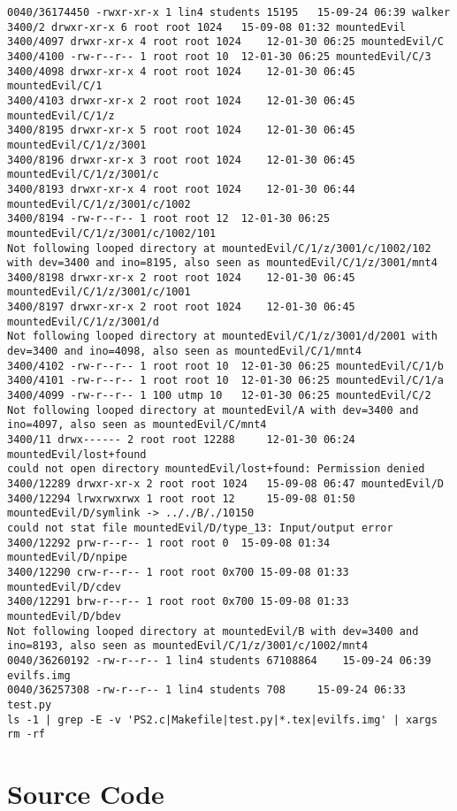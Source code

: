 \documentclass[12pt]{article}
\begin{document}
\begin{lstlisting}
0040/36174450 -rwxr-xr-x 1 lin4 students 15195	 15-09-24 06:39 walker
3400/2 drwxr-xr-x 6 root root 1024	 15-09-08 01:32 mountedEvil
3400/4097 drwxr-xr-x 4 root root 1024	 12-01-30 06:25 mountedEvil/C
3400/4100 -rw-r--r-- 1 root root 10	 12-01-30 06:25 mountedEvil/C/3
3400/4098 drwxr-xr-x 4 root root 1024	 12-01-30 06:45 mountedEvil/C/1
3400/4103 drwxr-xr-x 2 root root 1024	 12-01-30 06:45 mountedEvil/C/1/z
3400/8195 drwxr-xr-x 5 root root 1024	 12-01-30 06:45 mountedEvil/C/1/z/3001
3400/8196 drwxr-xr-x 3 root root 1024	 12-01-30 06:45 mountedEvil/C/1/z/3001/c
3400/8193 drwxr-xr-x 4 root root 1024	 12-01-30 06:44 mountedEvil/C/1/z/3001/c/1002
3400/8194 -rw-r--r-- 1 root root 12	 12-01-30 06:25 mountedEvil/C/1/z/3001/c/1002/101
Not following looped directory at mountedEvil/C/1/z/3001/c/1002/102 with dev=3400 and ino=8195, also seen as mountedEvil/C/1/z/3001/mnt4
3400/8198 drwxr-xr-x 2 root root 1024	 12-01-30 06:45 mountedEvil/C/1/z/3001/c/1001
3400/8197 drwxr-xr-x 2 root root 1024	 12-01-30 06:45 mountedEvil/C/1/z/3001/d
Not following looped directory at mountedEvil/C/1/z/3001/d/2001 with dev=3400 and ino=4098, also seen as mountedEvil/C/1/mnt4
3400/4102 -rw-r--r-- 1 root root 10	 12-01-30 06:25 mountedEvil/C/1/b
3400/4101 -rw-r--r-- 1 root root 10	 12-01-30 06:25 mountedEvil/C/1/a
3400/4099 -rw-r--r-- 1 100 utmp 10	 12-01-30 06:25 mountedEvil/C/2
Not following looped directory at mountedEvil/A with dev=3400 and ino=4097, also seen as mountedEvil/C/mnt4
3400/11 drwx------ 2 root root 12288	 12-01-30 06:24 mountedEvil/lost+found
could not open directory mountedEvil/lost+found: Permission denied
3400/12289 drwxr-xr-x 2 root root 1024	 15-09-08 06:47 mountedEvil/D
3400/12294 lrwxrwxrwx 1 root root 12	 15-09-08 01:50 mountedEvil/D/symlink -> .././B/./10150
could not stat file mountedEvil/D/type_13: Input/output error
3400/12292 prw-r--r-- 1 root root 0	 15-09-08 01:34 mountedEvil/D/npipe
3400/12290 crw-r--r-- 1 root root 0x700 15-09-08 01:33 mountedEvil/D/cdev
3400/12291 brw-r--r-- 1 root root 0x700 15-09-08 01:33 mountedEvil/D/bdev
Not following looped directory at mountedEvil/B with dev=3400 and ino=8193, also seen as mountedEvil/C/1/z/3001/c/1002/mnt4
0040/36260192 -rw-r--r-- 1 lin4 students 67108864	 15-09-24 06:39 evilfs.img
0040/36257308 -rw-r--r-- 1 lin4 students 708	 15-09-24 06:33 test.py
ls -1 | grep -E -v 'PS2.c|Makefile|test.py|*.tex|evilfs.img' | xargs rm -rf

\end{lstlisting}

\section{Source Code}
\end{document}
